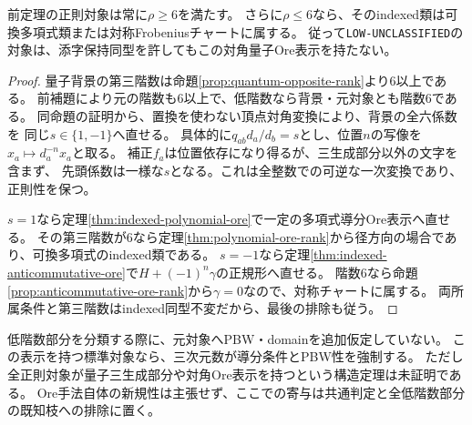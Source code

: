 \begin{theorem}[対角量子Ore表示から低階数残余は生じない]\label{thm:quantum-ore-low-exclusion}
前定理の正則対象は常に$\rho\geq6$を満たす。
さらに$\rho\leq6$なら、そのindexed類は可換多項式類または対称Frobeniusチャートに属する。
従って\texttt{LOW-UNCLASSIFIED}の対象は、添字保持同型を許してもこの対角量子Ore表示を持たない。
\end{theorem}
\begin{proof}
量子背景の第三階数は命題\ref{prop:quantum-opposite-rank}より6以上である。
前補題により元の階数も6以上で、低階数なら背景・元対象とも階数6である。
同命題の証明から、置換を使わない頂点対角変換により、背景の全六係数を
同じ$s\in\{1,-1\}$へ直せる。
具体的に$q_{ab}d_a/d_b=s$とし、位置$n$の写像を$x_a\mapsto d_a^{-n}x_a$と取る。
補正$f_a$は位置依存になり得るが、三生成部分以外の文字を含まず、
先頭係数は一様な$s$となる。これは全整数での可逆な一次変換であり、正則性を保つ。

$s=1$なら定理\ref{thm:indexed-polynomial-ore}で一定の多項式導分Ore表示へ直せる。
その第三階数が6なら定理\ref{thm:polynomial-ore-rank}から径方向の場合であり、可換多項式のindexed類である。
$s=-1$なら定理\ref{thm:indexed-anticommutative-ore}で$H+(-1)^n\gamma$の正規形へ直せる。
階数6なら命題\ref{prop:anticommutative-ore-rank}から$\gamma=0$なので、対称チャートに属する。
両所属条件と第三階数はindexed同型不変だから、最後の排除も従う。
\end{proof}
\begin{remark}
低階数部分を分類する際に、元対象へPBW・domainを追加仮定していない。
この表示を持つ標準対象なら、三次元数が導分条件とPBW性を強制する。
ただし全正則対象が量子三生成部分や対角Ore表示を持つという構造定理は未証明である。
Ore手法自体の新規性は主張せず、ここでの寄与は共通判定と全低階数部分の既知枝への排除に置く。
\end{remark}
